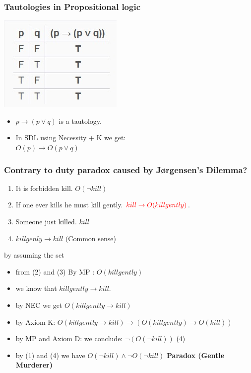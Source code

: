 \documentclass[9pt]{beamer}
\begin{document}
\begin{frame}
\frametitle{Tautologies in Propositional logic}
\centering
\includegraphics[scale=0.60]{table.jpg}
\begin{itemize}
	\item $p \rightarrow (p \vee q)$ is a tautology.
	\item In SDL using Necessity + K we get:\\
	$O(p)\rightarrow O(p \vee q)$
\end{itemize}
\end{frame}
\begin{frame}
\frametitle{Contrary to duty paradox caused by J\o{}rgensen's Dilemma?}
\begin{enumerate}
	\item It is forbidden kill. $O(\lnot kill)$
	\item If one ever kills he must kill gently. $\color{red}{kill} \rightarrow O(killgently)$.
	\item Someone just killed. $kill$
	\item $killgenly \rightarrow kill$ (Common sense) 
\end{enumerate}	

by assuming the set 
\begin{itemize}
	\item from (2) and (3) By MP : $O(kill gently)$
	\item we know that $kill gently \rightarrow kill$.
	\item by NEC we get $O(kill gently \rightarrow kill)$ 
	\item by Axiom K: $O(kill gently \rightarrow kill) \rightarrow (O(kill gently) \rightarrow O(kill) )$
	\item by MP and Axiom D: we conclude: $\lnot(O(\lnot kill))$ (4) 
	\item by (1) and (4) we have $O(\lnot kill) \wedge \lnot O(\lnot kill) $ \textbf{Paradox (Gentle Murderer)} 
\end{itemize}	
\end{frame}
\end{document}
